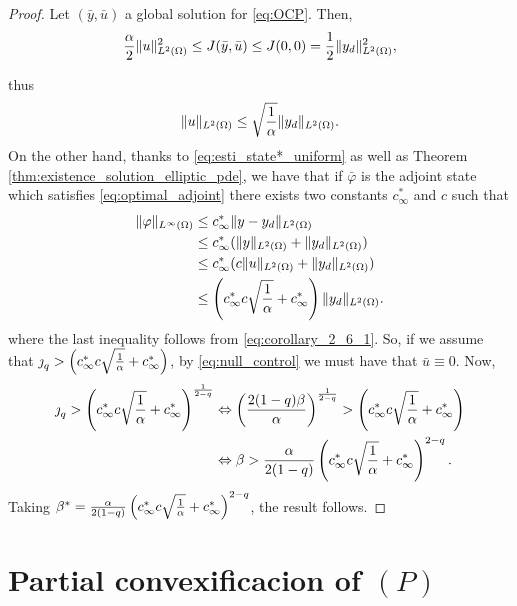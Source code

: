 	\begin{proof}
		Let $(\bar y, \bar u)$ a global solution for \eqref{eq:OCP}. Then,
		$$
			\frac{\alpha}{2}\lVert u \rVert_{L^2(\Omega)}^2\le J(\bar y, \bar u)\le J(0,0)=\frac{1}{2}\lVert y_d \rVert_{L^2(\Omega)}^2,
		$$
	
	thus 
	\begin{equation}\label{eq:corollary_2_6_1}
		\lVert u \rVert_{L^2(\Omega)}\le\sqrt{\frac{1}{\alpha}}\lVert y_d \rVert_{L^2(\Omega)}.
	\end{equation}
	On the other hand, thanks to \eqref{eq:esti_state*_uniform} as well as Theorem 
	\ref{thm:existence_solution_elliptic_pde}, we have that if $\bar \varphi$ is the adjoint state
	which satisfies \eqref{eq:optimal_adjoint} there exists two constants $c_{\infty}^*$ and $c$ such that
	\begin{align*}
		\lVert \varphi \rVert_{L^{\infty}(\Omega)}&\le c_{\infty}^*\lVert y-y_d \rVert_{L^2(\Omega)}\\
		&\le c_{\infty}^*(\lVert y \rVert_{L^2(\Omega)} + \lVert y_d \rVert_{L^2(\Omega)})\\
		&\le c_{\infty}^*(c\lVert u \rVert_{L^2(\Omega)} + \lVert y_d \rVert_{L^2(\Omega)})\\
		&\le \left(c_{\infty}^*c\sqrt{\frac{1}{\alpha}}+c_{\infty}^*\right)\lVert y_d \rVert_{L^2(\Omega)}.
	\end{align*}
	where the last inequality follows from \eqref{eq:corollary_2_6_1}. So, if we assume that $\operatorname{\jmath}_q>\left(c_{\infty}^*c\sqrt{\frac{1}{\alpha}}+c_{\infty}^*\right)$,
	by \eqref{eq:null_control} we must have that $\bar u\equiv 0$. Now,
	\begin{align*}
		\operatorname{\jmath}_q>\left(c_{\infty}^*c\sqrt{\frac{1}{\alpha}}+c_{\infty}^*\right)^{\frac{1}{2-q}}&\Leftrightarrow \left(\frac{2(1-q)\beta}{\alpha}\right)^{\frac{1}{2-q}}>\left(c_{\infty}^*c\sqrt{\frac{1}{\alpha}}+c_{\infty}^*\right)\\	
	&\Leftrightarrow \beta>\frac{\alpha}{2(1-q)}\left(c_{\infty}^*c\sqrt{\frac{1}{\alpha}}+c_{\infty}^*\right)^{2-q}.	
	\end{align*}
	Taking $\beta^*=\frac{\alpha}{2(1-q)}\left(c_{\infty}^*c\sqrt{\frac{1}{\alpha}}+c_{\infty}^*\right)^{2-q}$, the result follows.
	\end{proof}

	
	\section{Partial convexificacion of $(P)$}\label{section:problem_convexification}

